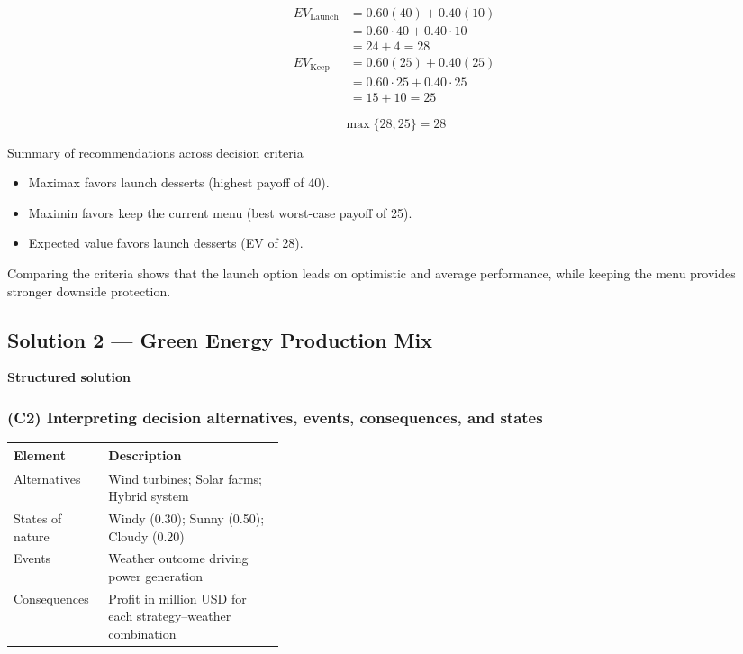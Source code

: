 \[
\begin{aligned}
EV_{\text{Launch}} &= 0.60(40) + 0.40(10) \\
&= 0.60\cdot40 + 0.40\cdot10 \\
&= 24 + 4 = 28 \\
EV_{\text{Keep}} &= 0.60(25) + 0.40(25) \\
&= 0.60\cdot25 + 0.40\cdot25 \\
&= 15 + 10 = 25
\end{aligned}
\]

\[
\max\{28, 25\} = 28
\]

Summary of recommendations across decision criteria

\begin{itemize}
	\item Maximax favors launch desserts (highest payoff of 40).
	\item Maximin favors keep the current menu (best worst-case payoff of 25).
	\item Expected value favors launch desserts (EV of 28).
\end{itemize}

Comparing the criteria shows that the launch option leads on optimistic and average performance, while keeping the
menu provides stronger downside protection.

\subsection{Solution 2 --- Green Energy Production Mix}\label{subsec:practice-activity-1-solution-2}

\textbf{Structured solution}

\subsubsection{(C2) Interpreting decision alternatives, events, consequences, and states}\label{subsubsec:practice-activity-1-solution-2-c2}

\begin{center}
	\begin{tabularx}{\linewidth}{@{}L{0.35\linewidth}Y@{}}
		\toprule
		Element & Description \\
		\midrule
		Alternatives & Wind turbines; Solar farms; Hybrid system \\
		States of nature & Windy (0.30); Sunny (0.50); Cloudy (0.20) \\
		Events & Weather outcome driving power generation \\
		Consequences & Profit in million USD for each strategy--weather combination \\
		\bottomrule
	\end{tabularx}
\end{center}

